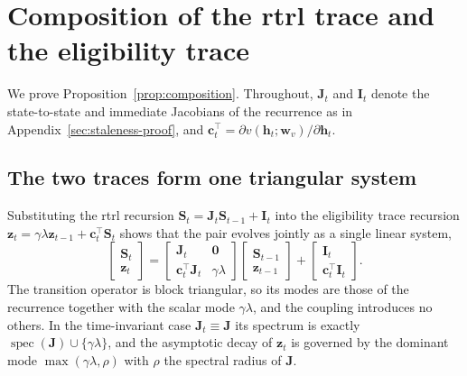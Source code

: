 \documentclass{article}
\begin{document}
\section{Composition of the \gls{rtrl} trace and the eligibility trace}
\label{sec:composition-proof}

We prove Proposition~\ref{prop:composition}. Throughout, $\boldsymbol{J}_t$ and
$\boldsymbol{I}_t$ denote the state-to-state and immediate Jacobians of the
recurrence as in Appendix~\ref{sec:staleness-proof}, and
$\boldsymbol{c}_t^\top = \partial v(\boldsymbol{h}_t;\boldsymbol{w}_v)/\partial \boldsymbol{h}_t$.

\subsection{The two traces form one triangular system}

Substituting the \gls{rtrl} recursion
$\boldsymbol{S}_t = \boldsymbol{J}_t \boldsymbol{S}_{t-1} + \boldsymbol{I}_t$ into the
eligibility trace recursion
$\boldsymbol{z}_t = \gamma\lambda\boldsymbol{z}_{t-1} + \boldsymbol{c}_t^\top\boldsymbol{S}_t$
shows that the pair evolves jointly as a single linear system,
\begin{equation}
    \begin{bmatrix} \boldsymbol{S}_t \\[2pt] \boldsymbol{z}_t \end{bmatrix}
    =
    \begin{bmatrix}
        \boldsymbol{J}_t & \boldsymbol{0} \\[2pt]
        \boldsymbol{c}_t^\top \boldsymbol{J}_t & \gamma\lambda
    \end{bmatrix}
    \begin{bmatrix} \boldsymbol{S}_{t-1} \\[2pt] \boldsymbol{z}_{t-1} \end{bmatrix}
    +
    \begin{bmatrix} \boldsymbol{I}_t \\[2pt] \boldsymbol{c}_t^\top \boldsymbol{I}_t \end{bmatrix} .
    \label{eq:joint-system}
\end{equation}
The transition operator is block triangular, so its modes are those of the
recurrence together with the scalar mode $\gamma\lambda$, and the coupling
introduces no others. In the time-invariant case $\boldsymbol{J}_t \equiv \boldsymbol{J}$
its spectrum is exactly $\operatorname{spec}(\boldsymbol{J}) \cup \{\gamma\lambda\}$,
and the asymptotic decay of $\boldsymbol{z}_t$ is governed by the dominant mode
$\max(\gamma\lambda, \rho)$ with $\rho$ the spectral radius of $\boldsymbol{J}$.
\end{document}
